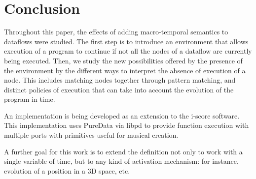 \documentclass{article}
\begin{document}
    
    
\section{Conclusion}
Throughout this paper, the effects of adding macro-temporal semantics to dataflows were studied. 
The first step is to introduce an environment that allows execution of a program to continue if not all the nodes of a dataflow are currently being executed.
Then, we study the new possibilities offered by the presence of the environment by the different ways to interpret the absence of execution of a node.
This includes matching nodes together through pattern matching, and distinct policies of execution that can take into account the evolution of the program in time.

An implementation is being developed as an extension to the i-score software. 
This implementation uses PureData via libpd to provide function execution with multiple ports
with primitives useful for musical creation.

A further goal for this work is to extend the definition not only to work with a single variable of time, but to any kind of activation mechanism: for instance, evolution of a position in a 3D space, etc.
    
\printbibliography 
\end{document}
